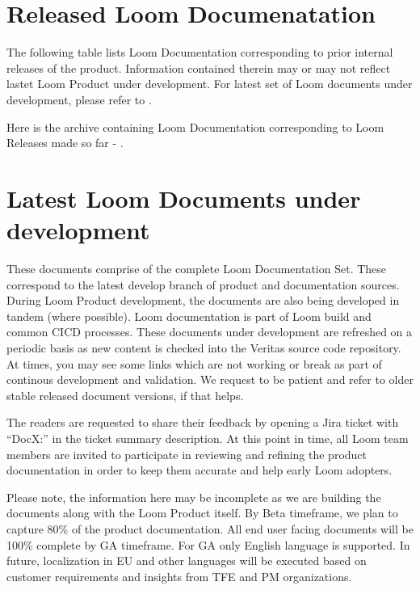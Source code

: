\documentclass[letterpaper,10pt,english]{sphinxmanual}
\begin{document}
\chapter{Released Loom Documenatation}
\label{\detokenize{loom_topindex:loom-release-docset}}\label{\detokenize{loom_topindex:released-loom-documenatation}}\label{\detokenize{loom_topindex:loom-documentation-site-map}}\label{\detokenize{loom_topindex:loom-topindex}}
The following table lists Loom Documentation corresponding to prior internal releases of the product.  Information contained therein may or may not reflect lastet Loom Product under development. For latest set of Loom documents under development, please refer to {\hyperref[\detokenize{loom_topindex:loom-latest-docset}]{}}.

Here is the archive containing Loom Documentation corresponding to Loom Releases made so far - .


\chapter{Latest Loom Documents under development}
\label{\detokenize{loom_topindex:latest-loom-documents-under-development}}\label{\detokenize{loom_topindex:loom-latest-docset}}
These documents comprise of the complete Loom Documentation Set. These correspond to the latest develop branch of product and documentation sources.  During Loom Product development, the documents are also being developed in tandem (where possible). Loom documentation is part of Loom build and common CICD processes. These documents under development are refreshed on a periodic basis as new content is checked into the Veritas source code repository. At times, you may see some links which are not working or break as part of continous development and validation.  We request to be patient and refer to older stable released document versions, if that helps.

The readers are requested to share their feedback by opening a Jira ticket with “DocX:” in the ticket summary description. At this point in time, all Loom team members are invited to participate in reviewing and refining the product documentation in order to keep them accurate and help early Loom adopters.

Please note, the information here may be incomplete as we are building the documents along with the Loom Product itself.  By Beta timeframe, we plan to capture 80\% of the product documentation.  All end user facing documents will be 100\% complete by GA timeframe.  For GA only English language is supported.  In future, localization in EU and other languages will be executed based on customer requirements and insights from TFE and PM organizations.
\end{document}
